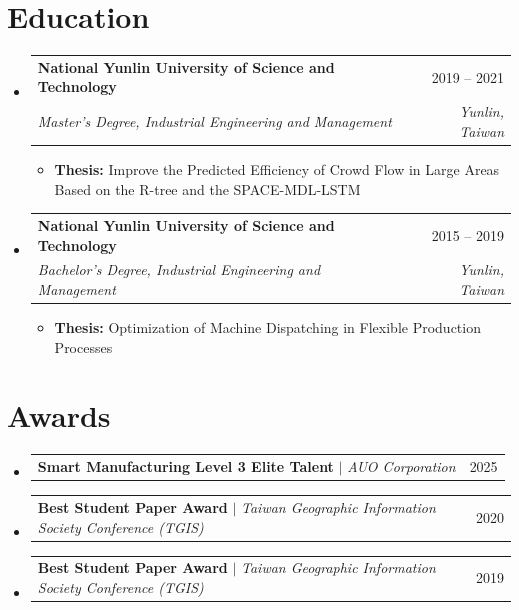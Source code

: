 \documentclass[letterpaper,11pt]{article}
\makeatletter
\newcommand{\resumeItem}[1]{
  \item\small{
    {#1 \vspace{-2pt}}
  }
}
\newcommand{\resumeSubheading}[4]{
  \vspace{-2pt}\item
    \begin{tabular*}{0.97\textwidth}[t]{l@{\extracolsep{\fill}}r}
      \textbf{#1} & #2 \\
      \textit{\small#3} & \textit{\small #4} \\
    \end{tabular*}\vspace{-7pt}
}
\newcommand{\resumeProjectHeading}[2]{
  \vspace{-2pt}\item
    \begin{tabular*}{0.97\textwidth}{l@{\extracolsep{\fill}}r}
      \small#1 & #2 \\
    \end{tabular*}\vspace{-7pt}
}
\newcommand{\resumeSubHeadingListStart}{\begin{itemize}[leftmargin=0.15in, label={}]}
\newcommand{\resumeSubHeadingListEnd}{\end{itemize}}
\newcommand{\resumeItemListStart}{\begin{itemize}}
\newcommand{\resumeItemListEnd}{\end{itemize}\vspace{-5pt}}
\makeatother
\begin{document}
\section{Education}
  \resumeSubHeadingListStart
    \resumeSubheading
      {National Yunlin University of Science and Technology}{2019 -- 2021}
      {Master's Degree, Industrial Engineering and Management}{Yunlin, Taiwan}
      \resumeItemListStart
        \resumeItem{\textbf{Thesis:} Improve the Predicted Efficiency of Crowd Flow in Large Areas Based on the R-tree and the SPACE-MDL-LSTM}
      \resumeItemListEnd
    \resumeSubheading
      {National Yunlin University of Science and Technology}{2015 -- 2019}
      {Bachelor's Degree, Industrial Engineering and Management}{Yunlin, Taiwan}
      \resumeItemListStart
        \resumeItem{\textbf{Thesis:} Optimization of Machine Dispatching in Flexible Production Processes}
      \resumeItemListEnd
  \resumeSubHeadingListEnd

\section{Awards}
  \resumeSubHeadingListStart
    \resumeProjectHeading
      {\textbf{Smart Manufacturing Level 3 Elite Talent} $|$ \emph{AUO Corporation}}{2025}
    \resumeProjectHeading
      {\textbf{Best Student Paper Award} $|$ \emph{Taiwan Geographic Information Society Conference (TGIS)}}{2020}
    \resumeProjectHeading
      {\textbf{Best Student Paper Award} $|$ \emph{Taiwan Geographic Information Society Conference (TGIS)}}{2019}
  \resumeSubHeadingListEnd
\end{document}
